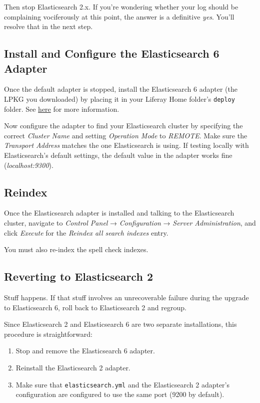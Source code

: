 Then stop Elasticsearch 2.x. If you're wondering whether your log should
be complaining vociferously at this point, the answer is a definitive
\emph{yes}. You'll resolve that in the next step.

\subsection{Install and Configure the Elasticsearch 6
Adapter}\label{install-and-configure-the-elasticsearch-6-adapter}

Once the default adapter is stopped, install the Elasticsearch 6 adapter
(the LPKG you downloaded) by placing it in your Liferay Home folder's
\texttt{deploy} folder. See
\href{/docs/7-0/user/-/knowledge_base/u/installing-apps-manually\#using-your-file-system-to-install-apps}{here}
for more information.

Now configure the adapter to find your Elasticsearch cluster by
specifying the correct \emph{Cluster Name} and setting \emph{Operation
Mode} to \emph{REMOTE}. Make sure the \emph{Transport Address} matches
the one Elasticsearch is using. If testing locally with Elasticsearch's
default settings, the default value in the adapter works fine
(\emph{localhost:9300}).

\subsection{Reindex}\label{reindex}

Once the Elasticsearch adapter is installed and talking to the
Elasticsearch cluster, navigate to \emph{Control Panel} →
\emph{Configuration} → \emph{Server Administration}, and click
\emph{Execute} for the \emph{Reindex all search indexes} entry.

You must also re-index the spell check indexes.

\subsection{Reverting to Elasticsearch
2}\label{reverting-to-elasticsearch-2}

Stuff happens. If that stuff involves an unrecoverable failure during
the upgrade to Elasticsearch 6, roll back to Elasticsearch 2 and
regroup.

Since Elasticsearch 2 and Elasticsearch 6 are two separate
installations, this procedure is straightforward:

\begin{enumerate}
\def\labelenumi{\arabic{enumi}.}
\item
  Stop and remove the Elasticsearch 6 adapter.
\item
  Reinstall the Elasticsearch 2 adapter.
\item
  Make sure that \texttt{elasticsearch.yml} and the Elasticsearch 2
  adapter's configuration are configured to use the same port (9200 by
  default).
\end{enumerate}

